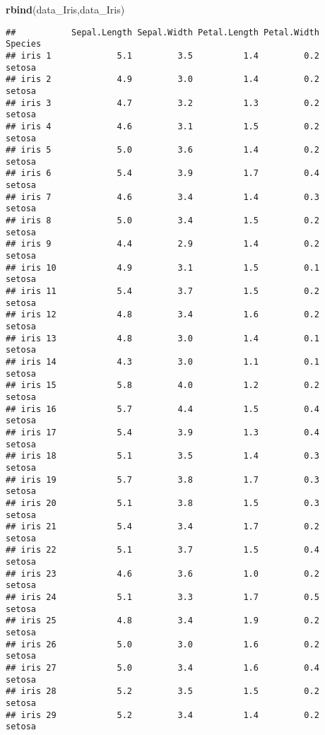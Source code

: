 \documentclass[
]{article}
\newenvironment{Shaded}{\begin{snugshade}}{\end{snugshade}}
\newcommand{\FunctionTok}[1]{\textcolor[rgb]{0.13,0.29,0.53}{\textbf{#1}}}
\newcommand{\NormalTok}[1]{#1}
\begin{document}
\begin{Shaded}
\begin{Highlighting}[]
\FunctionTok{rbind}\NormalTok{(data\_Iris,data\_Iris)}
\end{Highlighting}
\end{Shaded}

\begin{verbatim}
##           Sepal.Length Sepal.Width Petal.Length Petal.Width    Species
## iris 1             5.1         3.5          1.4         0.2     setosa
## iris 2             4.9         3.0          1.4         0.2     setosa
## iris 3             4.7         3.2          1.3         0.2     setosa
## iris 4             4.6         3.1          1.5         0.2     setosa
## iris 5             5.0         3.6          1.4         0.2     setosa
## iris 6             5.4         3.9          1.7         0.4     setosa
## iris 7             4.6         3.4          1.4         0.3     setosa
## iris 8             5.0         3.4          1.5         0.2     setosa
## iris 9             4.4         2.9          1.4         0.2     setosa
## iris 10            4.9         3.1          1.5         0.1     setosa
## iris 11            5.4         3.7          1.5         0.2     setosa
## iris 12            4.8         3.4          1.6         0.2     setosa
## iris 13            4.8         3.0          1.4         0.1     setosa
## iris 14            4.3         3.0          1.1         0.1     setosa
## iris 15            5.8         4.0          1.2         0.2     setosa
## iris 16            5.7         4.4          1.5         0.4     setosa
## iris 17            5.4         3.9          1.3         0.4     setosa
## iris 18            5.1         3.5          1.4         0.3     setosa
## iris 19            5.7         3.8          1.7         0.3     setosa
## iris 20            5.1         3.8          1.5         0.3     setosa
## iris 21            5.4         3.4          1.7         0.2     setosa
## iris 22            5.1         3.7          1.5         0.4     setosa
## iris 23            4.6         3.6          1.0         0.2     setosa
## iris 24            5.1         3.3          1.7         0.5     setosa
## iris 25            4.8         3.4          1.9         0.2     setosa
## iris 26            5.0         3.0          1.6         0.2     setosa
## iris 27            5.0         3.4          1.6         0.4     setosa
## iris 28            5.2         3.5          1.5         0.2     setosa
## iris 29            5.2         3.4          1.4         0.2     setosa

\end{verbatim}
\end{document}
